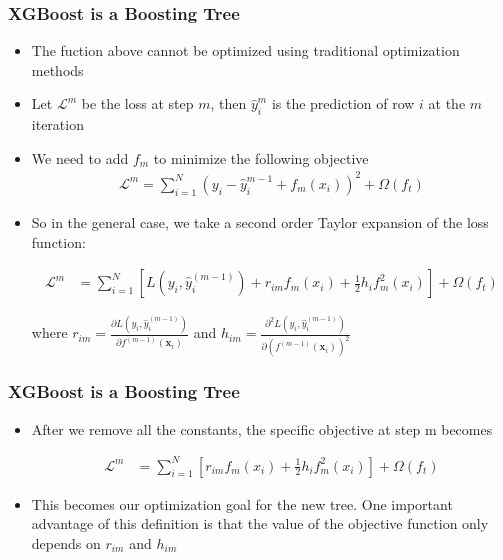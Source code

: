 \documentclass[
  shownotes,
  xcolor={svgnames},
  hyperref={colorlinks,citecolor=DarkBlue,linkcolor=DarkRed,urlcolor=DarkBlue}
  , aspectratio=169]{beamer}
\begin{document}
\begin{frame}[fragile]
\frametitle{XGBoost is a Boosting Tree }

\begin{itemize}
\item The fuction above cannot be optimized using traditional optimization methods
\item Let $\mathcal{L}^m$ be the loss at step $m$, then $\hat{y}_i^m$ is the prediction of row $i$ at the $m$ iteration
\item We need to add $f_m$ to minimize the following objective
  \begin{align}
\mathcal{L}^m=\sum_{i=1}^N (y_i-\hat{y}_i^{m-1} + f_m(x_i))^2  +  \Omega(f_t)
\end{align}

\item  So in the general case, we take a second order  Taylor expansion of the loss function:

\begin{align}
\mathcal{L}^m &= \sum_{i=1}^N \left[ L(y_i,\hat{y}_i^{(m-1)}) + r_{im} f_m(x_i) + \frac{1}{2}h_i f^2_m(x_i) \right] +  \Omega(f_t)
\end{align}

where  $r_{im} = \frac{\partial L(y_i,\hat{y}_i^{(m-1)})}{\partial f^{(m-1)}(\mathbf{x}_i)}$ and $h_{im} = \frac{\partial^2 L(y_i,\hat{y}_i^{(m-1)})}{\partial (f^{(m-1)}(\mathbf{x}_i))^2}$
  \end{itemize}
 \end{frame}
\begin{frame}[fragile]
\frametitle{XGBoost is a Boosting Tree }

\begin{itemize}


\item After we remove all the constants, the specific objective at step m becomes


\begin{align}
\mathcal{L}^m &= \sum_{i=1}^N \left[ r_{im} f_m(x_i) + \frac{1}{2}h_i f^2_m(x_i) \right] +  \Omega(f_t)
\end{align}

\item This becomes our optimization goal for the new tree. One important advantage of this definition is that the value of the objective function only depends on $r_{im}$ and $h_{im}$ 


\end{itemize}



 \end{frame}
\end{document}
